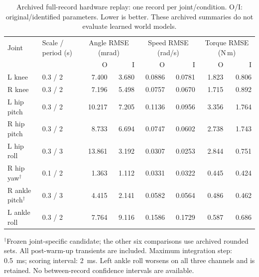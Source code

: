 \documentclass[letterpaper,10pt,conference]{ieeeconf}
\begin{document}
\begin{table}[t]
\centering
\caption{Archived full-record hardware replay: one record per joint/condition. O/I: original/identified parameters. Lower is better. These archived summaries do not evaluate learned world models.}
\label{tab:archived}
\small
\setlength{\tabcolsep}{5pt}
\begin{tabular}{@{}llrrrrrr@{}}
\toprule
Joint & Scale / period (s) & \multicolumn{2}{c}{Angle RMSE (mrad)} & \multicolumn{2}{c}{Speed RMSE (rad/s)} & \multicolumn{2}{c}{Torque RMSE (N\,m)} \\
 & & O & I & O & I & O & I \\
\midrule
L knee & 0.3 / 2 & 7.400 & 3.680 & 0.0886 & 0.0781 & 1.823 & 0.806 \\
R knee & 0.3 / 2 & 7.196 & 5.498 & 0.0757 & 0.0670 & 1.715 & 0.892 \\
L hip pitch & 0.3 / 2 & 10.217 & 7.205 & 0.1136 & 0.0956 & 3.356 & 1.764 \\
R hip pitch & 0.3 / 2 & 8.733 & 6.694 & 0.0747 & 0.0602 & 2.738 & 1.743 \\
L hip roll & 0.3 / 3 & 13.861 & 3.192 & 0.0307 & 0.0253 & 2.844 & 0.751 \\
R hip yaw$^{\dagger}$ & 0.1 / 2 & 1.363 & 1.112 & 0.0331 & 0.0322 & 0.445 & 0.424 \\
R ankle pitch$^{\dagger}$ & 0.3 / 3 & 4.415 & 2.141 & 0.0582 & 0.0564 & 0.486 & 0.462 \\
L ankle roll & 0.3 / 2 & 7.764 & 9.116 & 0.1586 & 0.1729 & 0.587 & 0.686 \\
\bottomrule
\end{tabular}

\vspace{3pt}
\parbox{0.97\textwidth}{\footnotesize $^{\dagger}$Frozen joint-specific candidate; the other six comparisons use archived rounded sets. All post-warm-up transients are included. Maximum integration step: 0.5~ms; scoring interval: 2~ms. Left ankle roll worsens on all three channels and is retained. No between-record confidence intervals are available.}
\end{table}
\end{document}
